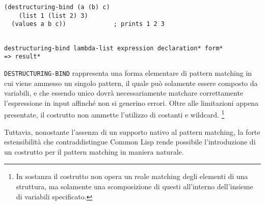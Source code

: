 \begin{lstlisting}[caption=Esempio utilizzo della macro
  \texttt{DESTRUCTURING-BIND}.]
(destructuring-bind (a (b) c)
    (list 1 (list 2) 3)
  (values a b c))             ; prints 1 2 3
\end{lstlisting}

\begin{lstlisting}[caption=Sintassi della macro \texttt{DESTRUCTURING-BIND}.]

destructuring-bind lambda-list expression declaration* form*
=> result*

\end{lstlisting}

\texttt{DESTRUCTURING-BIND} rappresenta una forma elementare di pattern matching
in cui viene ammesso un singolo pattern, il quale può solamente essere composto
da variabili, e che essendo unico dovrà necessariamente matchare correttamente
l’espressione in input affinché non si generino errori. Oltre alle limitazioni
appena presentate, il costrutto non ammette l'utilizzo di costanti e wildcard.
\footnote{In sostanza il costrutto non opera un reale matching degli elementi di
una struttura, ma solamente una scomposizione di questi all'interno dell'insieme
di variabili specificato.}

Tuttavia, nonostante l'assenza di un supporto nativo al pattern matching, la
forte estensibilità che contraddistingue Common Lisp rende possibile
l'introduzione di un costrutto per il pattern matching in maniera naturale.


